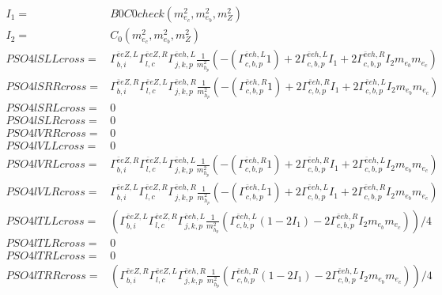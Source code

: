 \documentclass[A4,landscape]{article}
\begin{document}
\begin{align} 
I_1= & B0C0check(m^2_{e_{{c}}}, m^2_{e_{{b}}}, m^2_{Z}) \\ 
I_2= & C_0(m^2_{e_{{c}}}, m^2_{e_{{b}}}, m^2_{Z}) \\ 
  PSO4lSLLcross= &  \Gamma^{\bar{e}e Z ,L}_{b, i} \Gamma^{\bar{e}e Z ,R}_{l, c} \Gamma^{\bar{e}e h ,L}_{j, k, p} \frac{1}{m^2_{h_{{p}}}} (-(\Gamma^{\bar{e}e h ,L}_{c, b, p} 1) + 2 \Gamma^{\bar{e}e h ,L}_{c, b, p} I_1 + 2 \Gamma^{\bar{e}e h ,R}_{c, b, p} I_2 m_{e_{{b}}} m_{e_{{c}}}) \\ 
  PSO4lSRRcross= &  \Gamma^{\bar{e}e Z ,R}_{b, i} \Gamma^{\bar{e}e Z ,L}_{l, c} \Gamma^{\bar{e}e h ,R}_{j, k, p} \frac{1}{m^2_{h_{{p}}}} (-(\Gamma^{\bar{e}e h ,R}_{c, b, p} 1) + 2 \Gamma^{\bar{e}e h ,R}_{c, b, p} I_1 + 2 \Gamma^{\bar{e}e h ,L}_{c, b, p} I_2 m_{e_{{b}}} m_{e_{{c}}}) \\ 
  PSO4lSRLcross= & 0 \\ 
  PSO4lSLRcross= & 0 \\ 
  PSO4lVRRcross= & 0 \\ 
  PSO4lVLLcross= & 0 \\ 
  PSO4lVRLcross= &  \Gamma^{\bar{e}e Z ,R}_{b, i} \Gamma^{\bar{e}e Z ,L}_{l, c} \Gamma^{\bar{e}e h ,L}_{j, k, p} \frac{1}{m^2_{h_{{p}}}} (-(\Gamma^{\bar{e}e h ,R}_{c, b, p} 1) + 2 \Gamma^{\bar{e}e h ,R}_{c, b, p} I_1 + 2 \Gamma^{\bar{e}e h ,L}_{c, b, p} I_2 m_{e_{{b}}} m_{e_{{c}}}) \\ 
  PSO4lVLRcross= &  \Gamma^{\bar{e}e Z ,L}_{b, i} \Gamma^{\bar{e}e Z ,R}_{l, c} \Gamma^{\bar{e}e h ,R}_{j, k, p} \frac{1}{m^2_{h_{{p}}}} (-(\Gamma^{\bar{e}e h ,L}_{c, b, p} 1) + 2 \Gamma^{\bar{e}e h ,L}_{c, b, p} I_1 + 2 \Gamma^{\bar{e}e h ,R}_{c, b, p} I_2 m_{e_{{b}}} m_{e_{{c}}}) \\ 
  PSO4lTLLcross= & ( \Gamma^{\bar{e}e Z ,L}_{b, i} \Gamma^{\bar{e}e Z ,R}_{l, c} \Gamma^{\bar{e}e h ,L}_{j, k, p} \frac{1}{m^2_{h_{{p}}}} (\Gamma^{\bar{e}e h ,L}_{c, b, p} (1 - 2 I_1) - 2 \Gamma^{\bar{e}e h ,R}_{c, b, p} I_2 m_{e_{{b}}} m_{e_{{c}}}))/4 \\ 
  PSO4lTLRcross= & 0 \\ 
  PSO4lTRLcross= & 0 \\ 
  PSO4lTRRcross= & ( \Gamma^{\bar{e}e Z ,R}_{b, i} \Gamma^{\bar{e}e Z ,L}_{l, c} \Gamma^{\bar{e}e h ,R}_{j, k, p} \frac{1}{m^2_{h_{{p}}}} (\Gamma^{\bar{e}e h ,R}_{c, b, p} (1 - 2 I_1) - 2 \Gamma^{\bar{e}e h ,L}_{c, b, p} I_2 m_{e_{{b}}} m_{e_{{c}}}))/4 \\ 
\end{align} 
\end{document}
